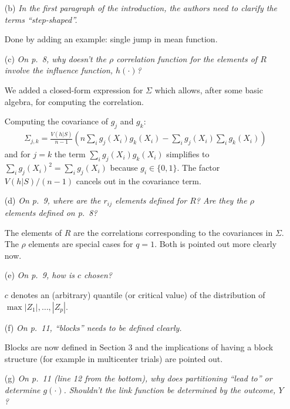 \documentclass[11pt,a4paper]{article}
\begin{document}
\begin{enumerate}
\begin{itemize}
    \item[(b)] \textit{In the first paragraph of the introduction, the authors need to
               clarify the terms ``step-shaped''.}
	       
	       Done by adding an example: single jump in mean function.
	       
    \item[(c)] \textit{On p.~8, why doesn't the $\rho$ correlation function for the
               elements of $R$ involve the influence function, $h(\cdot)$?}
	       
	       We added a closed-form expression for $\Sigma$ which allows,
               after some basic algebra, for computing the correlation.

               Computing the covariance of $g_j$ and $g_k$:
\begin{eqnarray*}
\Sigma_{j,k} = \frac{V(h | S)}{n-1}\left(n \sum_i g_j(X_i) g_k(X_i) - \sum_i g_j(X_i) \sum_i g_k(X_i)\right)
\end{eqnarray*}
and for $j = k$ the term $\sum_i g_j(X_i) g_k(X_i)$ simplifies to 
$\sum_i g_j(X_i)^2 = \sum_i g_j(X_i)$ because $g_i \in \{0, 1\}$. The factor $V(h | S) / (n-1)$
cancels out in the covariance term.
	       
    \item[(d)] \textit{On p.~9, where are the $r_{ij}$ elements defined for $R$? Are
               they the $\rho$ elements defined on p.~8?}
    
               The elements of $R$ are the correlations corresponding to the covariances
	       in $\Sigma$. The $\rho$ elements are special cases for $q = 1$.
	       Both is pointed out more clearly now.

    \item[(e)] \textit{On p.~9, how is $c$ chosen?}
    
               $c$ denotes an (arbitrary) quantile (or critical value) of the distribution
	       of $\max  |Z_1|, \dots, |Z_p|$.
	       
    \item[(f)] \textit{On p.~11, ``blocks'' needs to be defined clearly.}
               
	       Blocks are now defined in Section 3 and the implications
               of having a block structure (for example in multicenter trials) 
               are pointed out.
               
	       
    \item[(g)] \textit{On p.~11 (line 12 from the bottom), why does partitioning 
               ``lead to'' or determine $g(\cdot)$. Shouldn't the link function be
	       determined by the outcome, $Y$?}
	       

\end{itemize}
\end{enumerate}
\end{document}
